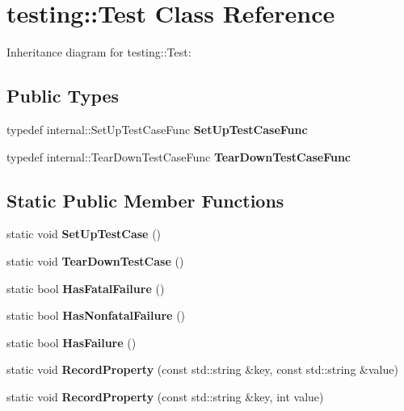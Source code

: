 \hypertarget{classtesting_1_1Test}{}\section{testing\+:\+:Test Class Reference}
\label{classtesting_1_1Test}


Inheritance diagram for testing\+:\+:Test\+:
\subsection*{Public Types}
\begin{DoxyCompactItemize}
\item 
\mbox{\label{classtesting_1_1Test_a5f2a051d1d99c9b784c666c586186cf9}} 
typedef internal\+::\+Set\+Up\+Test\+Case\+Func {\bfseries Set\+Up\+Test\+Case\+Func}
\item 
\mbox{\label{classtesting_1_1Test_aa0f532e93b9f3500144c53f31466976c}} 
typedef internal\+::\+Tear\+Down\+Test\+Case\+Func {\bfseries Tear\+Down\+Test\+Case\+Func}
\end{DoxyCompactItemize}
\subsection*{Static Public Member Functions}
\begin{DoxyCompactItemize}
\item 
\mbox{\label{classtesting_1_1Test_a5ccbac42fee8c5b00b0bfe89b6c49d79}} 
static void {\bfseries Set\+Up\+Test\+Case} ()
\item 
\mbox{\label{classtesting_1_1Test_af374706cbaf0ffc460f4fd04e7c150f1}} 
static void {\bfseries Tear\+Down\+Test\+Case} ()
\item 
\mbox{\label{classtesting_1_1Test_a5e83604628ef542af888d631566ff60c}} 
static bool {\bfseries Has\+Fatal\+Failure} ()
\item 
\mbox{\label{classtesting_1_1Test_a8c00e8cc6fe10616b480bd54d2a426cb}} 
static bool {\bfseries Has\+Nonfatal\+Failure} ()
\item 
\mbox{\label{classtesting_1_1Test_a7a00be7dd0a6bfdc8d47a1b784623613}} 
static bool {\bfseries Has\+Failure} ()
\item 
\mbox{\label{classtesting_1_1Test_a1559ce1c83f56993b582650c091535a7}} 
static void {\bfseries Record\+Property} (const std\+::string \&key, const std\+::string \&value)
\item 
\mbox{\label{classtesting_1_1Test_a373da47b491b1e64e355d22d6ec99b5b}} 
static void {\bfseries Record\+Property} (const std\+::string \&key, int value)
\end{DoxyCompactItemize}
